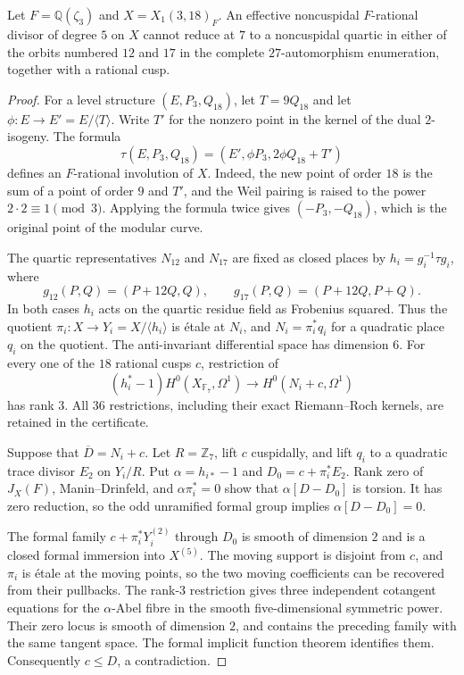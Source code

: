 \begin{lemma}\label{lem:decic-318-quartic-fibre}
Let $F=\mathbb Q(\zeta_3)$ and $X=X_1(3,18)_F$.
An effective noncuspidal $F$-rational divisor of degree $5$ on $X$
cannot reduce at $7$ to a noncuspidal quartic in either of the
orbits numbered $12$ and $17$ in the complete $27$-automorphism
enumeration, together with a rational cusp.
\end{lemma}
\begin{proof}
For a level structure $(E,P_3,Q_{18})$, let $T=9Q_{18}$ and
let $\phi:E\to E'=E/\langle T\rangle$.
Write $T'$ for the nonzero point in the kernel of the dual
$2$-isogeny. The formula
\[
 \tau(E,P_3,Q_{18})=
      (E',\phi P_3,2\phi Q_{18}+T')
\]
defines an $F$-rational involution of $X$.
Indeed, the new point of order $18$ is the sum of a point of
order $9$ and $T'$, and the Weil pairing is raised to the power
$2\cdot2\equiv1\pmod3$. Applying the formula twice gives
$(-P_3,-Q_{18})$, which is the original point of the modular curve.

The quartic representatives $N_{12}$ and $N_{17}$ are fixed
as closed places by $h_i=g_i^{-1}\tau g_i$, where
\[
 g_{12}(P,Q)=(P+12Q,Q),\qquad
 g_{17}(P,Q)=(P+12Q,P+Q).
\]
In both cases $h_i$ acts on the quartic residue field as
Frobenius squared. Thus the quotient $\pi_i:X\to Y_i=X/\langle h_i\rangle$
is \'etale at $N_i$, and
$N_i=\pi_i^*q_i$ for a quadratic place $q_i$ on the quotient.
The anti-invariant differential space has dimension $6$.
For every one of the $18$ rational cusps $c$, restriction of
\[
 (h_i^*-1)H^0(X_{\mathbb F_7},\Omega^1)
       \longrightarrow H^0(N_i+c,\Omega^1)
\]
has rank $3$. All $36$ restrictions, including their exact
Riemann--Roch kernels, are retained in the certificate.

Suppose that $\overline D=N_i+c$.
Let $R=\mathbb Z_7$, lift $c$ cuspidally, and lift $q_i$ to a
quadratic trace divisor $E_2$ on $Y_i/R$.
Put $\alpha=h_{i*}-1$ and $D_0=c+\pi_i^*E_2$.
Rank zero of $J_X(F)$, Manin--Drinfeld, and
$\alpha\pi_i^*=0$ show that $\alpha[D-D_0]$ is torsion.
It has zero reduction, so the odd unramified formal group
implies $\alpha[D-D_0]=0$.

The formal family $c+\pi_i^*Y_i^{(2)}$ through $D_0$ is smooth
of dimension $2$ and is a closed formal immersion into $X^{(5)}$.
The moving support is disjoint from $c$, and $\pi_i$ is \'etale
at the moving points, so the two moving coefficients can be
recovered from their pullbacks.
The rank-$3$ restriction gives three independent cotangent
equations for the $\alpha$-Abel fibre in the smooth
five-dimensional symmetric power. Their zero locus is smooth
of dimension $2$, and contains the preceding family with the
same tangent space. The formal implicit function theorem
identifies them. Consequently $c\leq D$, a contradiction.
\end{proof}
